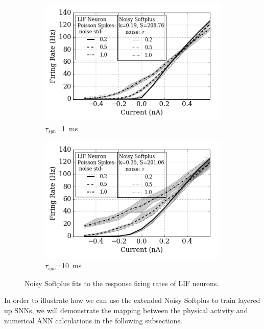 \documentclass{article}
\begin{document}
\begin{figure}
	\centering
	\begin{subfigure}[htb]{0.49\textwidth}
		\includegraphics[width=\textwidth]{pics_iconip/4-1.png}
		\caption{$\tau_{syn}$=1~ms}
	\end{subfigure}
	\begin{subfigure}[htb]{0.49\textwidth}
		\includegraphics[width=\textwidth]{pics_iconip/4-10.png}
		\caption{$\tau_{syn}$=10~ms}
	\end{subfigure}
	\caption{Noisy Softplus fits to the response firing rates of LIF neurons.}
	\label{Fig:nsptau1}
\end{figure}		
In order to illustrate how we can use the extended Noisy Softplus to train layered up SNNs, we will demonstrate the mapping between the physical activity and numerical ANN calculations in the following subsections. 
\end{document}
